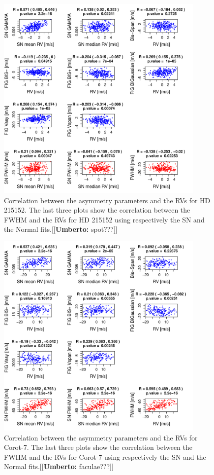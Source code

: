 \documentclass[11pt, oneside]{article}
\newcommand{\umberto}[1]{{\color{green}[[\textbf{Umberto: }#1]]}}
\begin{document}
\begin{figure}[htbp]
   \centering
\includegraphics[height = 4in]{HD21515_[4]Comparison_para.pdf}  
   \caption{Correlation between the asymmetry parameters and the RVs for HD 215152. The last three plots show the correlation between the FWHM and the RVs for HD 215152 using respectively the SN and the Normal fits.\umberto{spot???}}
   \label{fig:HD215152:corrPlot}
\end{figure}

\begin{figure}[htbp]
   \centering
\includegraphics[height = 4in]{LRa01_E_[4]Comparison_para.pdf} 
   \caption{Correlation between the asymmetry parameters and the RVs for Corot-7. The last three plots show the correlation between the FWHM and the RVs for Corot-7 using respectively the SN and the Normal fits.\umberto{faculae???}}
   \label{fig:Corot7:corrPlot}
\end{figure}
\end{document}

